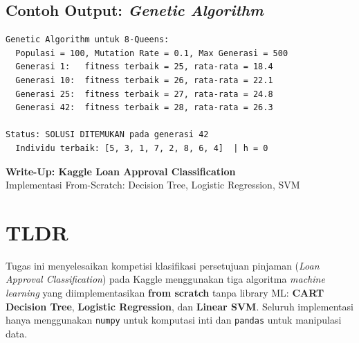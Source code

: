 \documentclass[12pt,a4paper]{article}
\begin{document}
\subsection{Contoh Output: \textit{Genetic Algorithm}}
\label{subsec:contoh-ga}

\begin{lstlisting}[language={}, basicstyle=\ttfamily\small, frame=single, caption={Contoh output \textit{Genetic Algorithm}.}]
Genetic Algorithm untuk 8-Queens:
  Populasi = 100, Mutation Rate = 0.1, Max Generasi = 500
  Generasi 1:   fitness terbaik = 25, rata-rata = 18.4
  Generasi 10:  fitness terbaik = 26, rata-rata = 22.1
  Generasi 25:  fitness terbaik = 27, rata-rata = 24.8
  Generasi 42:  fitness terbaik = 28, rata-rata = 26.3

Status: SOLUSI DITEMUKAN pada generasi 42
  Individu terbaik: [5, 3, 1, 7, 2, 8, 6, 4]  | h = 0
\end{lstlisting}


\newpage
\setcounter{section}{0}
\renewcommand{\thesection}{K.\arabic{section}}

\begin{center}
    {\LARGE \textbf{Write-Up: Kaggle Loan Approval Classification}}\\[0.3cm]
    {\large Implementasi From-Scratch: Decision Tree, Logistic Regression, SVM}\\[0.5cm]
\end{center}

\section{TLDR}
\label{sec:tldr}

Tugas ini menyelesaikan kompetisi klasifikasi persetujuan pinjaman (\textit{Loan Approval Classification}) pada Kaggle menggunakan tiga algoritma \textit{machine learning} yang diimplementasikan \textbf{from scratch} tanpa library ML: \textbf{CART Decision Tree}, \textbf{Logistic Regression}, dan \textbf{Linear SVM}. Seluruh implementasi hanya menggunakan \texttt{numpy} untuk komputasi inti dan \texttt{pandas} untuk manipulasi data.
\end{document}
